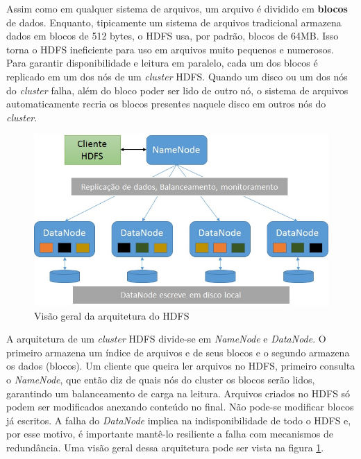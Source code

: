 Assim como em qualquer sistema de arquivos, um arquivo é dividido em \textbf{blocos} de dados. Enquanto, tipicamente um sistema de arquivos tradicional armazena dados em blocos de 512 bytes, o HDFS usa, por padrão, blocos de 64MB. Isso torna o HDFS ineficiente para uso em arquivos muito pequenos e numerosos. Para garantir disponibilidade e leitura em paralelo, cada um dos blocos é replicado em um dos nós de um \textit{cluster} HDFS. Quando um disco ou um dos nós do \textit{cluster} falha, além do bloco poder ser lido de outro nó, o sistema de arquivos automaticamente recria os blocos presentes naquele disco em outros nós do \textit{cluster}.
\begin{figure}
	\centering
	\includegraphics[width=\linewidth]{./Arquitetura_HDFS.jpg}
	\caption{Visão geral da arquitetura do HDFS}
	\label{fig:hdfs_arch}
\end{figure}

A arquitetura de um \textit{cluster} HDFS divide-se em \textit{NameNode} e \textit{DataNode}. O primeiro armazena um índice de arquivos e de seus blocos e o segundo armazena os dados (blocos). Um cliente que queira ler arquivos no HDFS, primeiro consulta o \textit{NameNode}, que então diz de quais nós do cluster os blocos serão lidos, garantindo um balanceamento de carga na leitura. Arquivos criados no HDFS só podem ser modificados anexando conteúdo no final. Não pode-se modificar blocos já escritos. A falha do \textit{DataNode} implica na indisponibilidade de todo o HDFS e, por esse motivo, é importante mantê-lo resiliente a falha com mecanismos de redundância. Uma visão geral dessa arquitetura pode ser vista na figura \ref{fig:hdfs_arch}.

